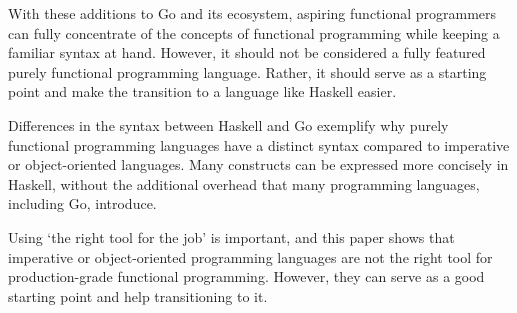 With these additions to Go and its ecosystem, aspiring functional programmers
can fully concentrate of the concepts of functional programming while keeping
a familiar syntax at hand. However, it should not be considered a fully featured
purely functional programming language. Rather, it should serve as a starting point and
make the transition to a language like Haskell easier.

Differences in the syntax between Haskell and Go exemplify why purely functional programming
languages have a distinct syntax compared to imperative or object-oriented languages.
Many constructs can be expressed more concisely in Haskell, without the additional
overhead that many programming languages, including Go, introduce.

Using `the right tool for the job' is important, and this paper shows that imperative or
object-oriented programming languages are not the right tool for production-grade
functional programming. However, they can serve as a good starting point and help transitioning
to it.
